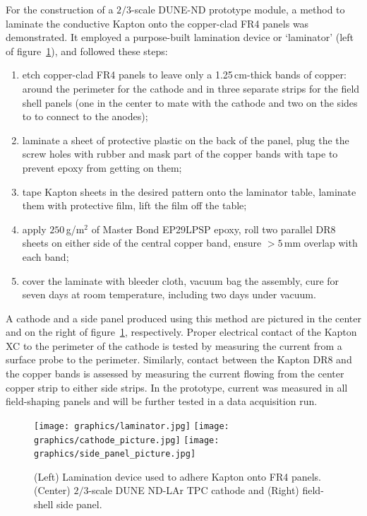 For the construction of a $2/3$-scale DUNE-ND prototype module, a method to laminate the conductive Kapton onto the copper-clad FR4 panels was demonstrated. It employed a purpose-built lamination device or `laminator' (left of figure~\ref{fig:field_shell_laminations}), and followed these steps:
\begin{enumerate}
    \item etch copper-clad FR4 panels to leave only a 1.25\,cm-thick bands of copper: around the perimeter for the cathode and in three separate strips for the field shell panels (one in the center to mate with the cathode and two on the sides to to connect to the anodes);
    \item laminate a sheet of protective plastic on the back of the panel, plug the the screw holes with rubber and mask part of the copper bands with tape to prevent epoxy from getting on them;
    \item tape Kapton sheets in the desired pattern onto the laminator table, laminate them with protective film, lift the film off the table;
    \item apply $250$\,g/m$^2$ of Master Bond EP29LPSP epoxy, roll two parallel DR8 sheets on either side of the central copper band, ensure $>5\,$mm overlap with each band;
    \item cover the laminate with bleeder cloth, vacuum bag the assembly, cure for seven days at room temperature, including two days under vacuum.
\end{enumerate}
A cathode and a side panel produced using this method are pictured in the center and on the right of figure~\ref{fig:field_shell_laminations}, respectively. Proper electrical contact of the Kapton XC to the perimeter of the cathode is tested by measuring the current from a surface probe to the perimeter. Similarly, contact between the Kapton DR8 and the copper bands is assessed by measuring the current flowing from the center copper strip to either side strips. In the prototype, current was measured in all field-shaping panels and will be further tested in a data acquisition run.

\begin{figure}[htbp]
\centering

\texttt{[image: graphics/laminator.jpg]}
\qquad
\texttt{[image: graphics/cathode\_picture.jpg]}
\qquad
\texttt{[image: graphics/side\_panel\_picture.jpg]}
\caption{(Left) Lamination device used to adhere Kapton onto FR4 panels. (Center) $2/3$-scale DUNE ND-LAr TPC cathode and (Right) field-shell side panel.}
\label{fig:field_shell_laminations}
\end{figure}


